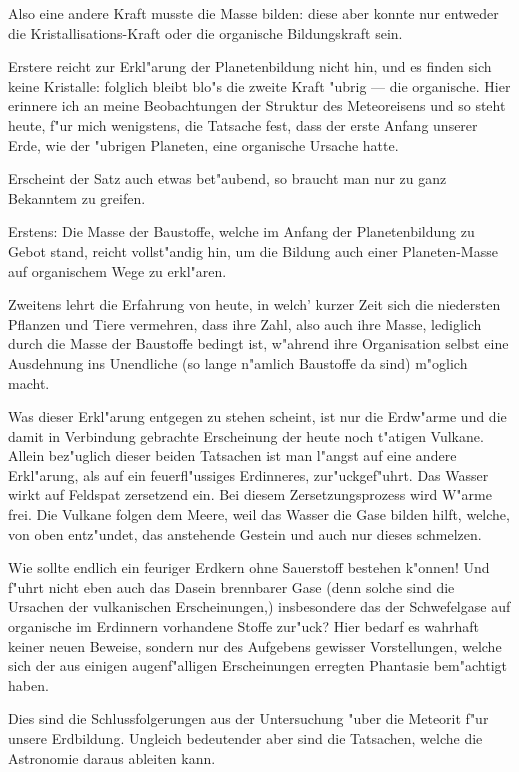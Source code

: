 \documentclass[a4paper, 11pt, oneside]{article}
\begin{document}
Also eine andere Kraft musste die Masse bilden: diese aber konnte nur entweder die Kristallisations-Kraft oder die organische Bildungskraft sein.

Erstere reicht zur Erkl"arung der Planetenbildung nicht hin, und es finden sich keine Kristalle: folglich bleibt blo"s die zweite Kraft "ubrig --- die organische. Hier erinnere ich an meine Beobachtungen der Struktur des Meteoreisens und so steht heute, f"ur mich wenigstens, die Tatsache fest, dass der erste Anfang unserer Erde, wie der "ubrigen Planeten, eine organische Ursache hatte.

Erscheint der Satz auch etwas bet"aubend, so braucht man nur zu ganz Bekanntem zu greifen.

Erstens: Die Masse der Baustoffe, welche im Anfang der Planetenbildung zu Gebot stand, reicht vollst"andig hin, um die Bildung auch einer Planeten-Masse auf organischem Wege zu erkl"aren.

Zweitens lehrt die Erfahrung von heute, in welch' kurzer Zeit sich die niedersten Pflanzen und Tiere vermehren, dass ihre Zahl, also auch ihre Masse, lediglich durch die Masse der Baustoffe bedingt ist, w"ahrend ihre Organisation selbst eine Ausdehnung ins Unendliche (so lange n"amlich Baustoffe da sind) m"oglich macht.

Was dieser Erkl"arung entgegen zu stehen scheint, ist nur die Erdw"arme und die damit in Verbindung gebrachte Erscheinung der heute noch t"atigen Vulkane. Allein bez"uglich dieser beiden Tatsachen ist man l"angst auf eine andere Erkl"arung, als auf ein feuerfl"ussiges Erdinneres, zur"uckgef"uhrt. Das Wasser wirkt auf Feldspat zersetzend ein. Bei diesem Zersetzungsprozess wird W"arme frei. Die Vulkane folgen dem Meere, weil das Wasser die Gase bilden hilft, welche, von oben entz"undet, das anstehende Gestein und auch nur dieses schmelzen.

Wie sollte endlich ein feuriger Erdkern ohne Sauerstoff bestehen k"onnen! Und f"uhrt nicht eben auch das Dasein brennbarer Gase (denn solche sind die Ursachen der vulkanischen Erscheinungen,) insbesondere das der Schwefelgase auf organische im Erdinnern vorhandene Stoffe zur"uck? Hier bedarf es wahrhaft keiner neuen Beweise, sondern nur des Aufgebens gewisser Vorstellungen, welche sich der aus einigen augenf"alligen Erscheinungen erregten Phantasie bem"achtigt haben.

Dies sind die Schlussfolgerungen aus der Untersuchung "uber die Meteorit f"ur unsere Erdbildung. Ungleich bedeutender aber sind die Tatsachen, welche die Astronomie daraus ableiten kann.
\end{document}
